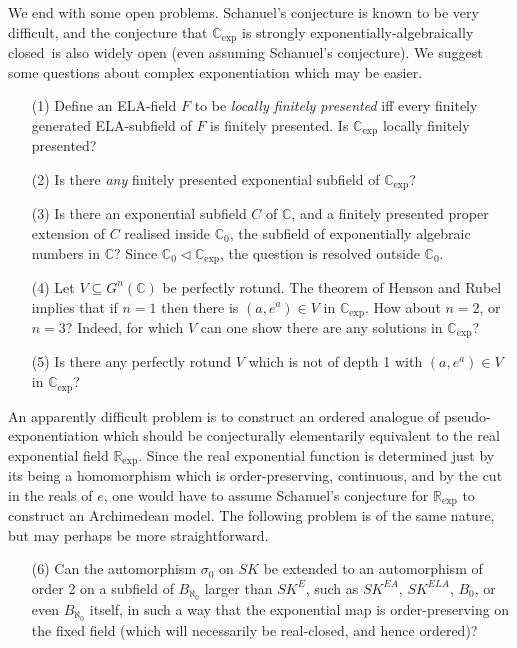 \documentclass[12pt]{amsart}
\theoremstyle{definition}
\begin{document}
We end with some open problems. Schanuel's conjecture is known to be very difficult, and the conjecture that ${\ensuremath{\mathbb{C}_{\mathrm{exp}}}}$ is {strongly exponentially-algebraically closed}\ is also widely open (even assuming Schanuel's conjecture). We suggest some questions about complex exponentiation which may be easier.

\begin{enumerate}
 \item[(1)] Define an ELA-field $F$ to be \emph{locally finitely presented} iff
  every finitely generated ELA-subfield of $F$ is finitely presented. Is ${\ensuremath{\mathbb{C}_{\mathrm{exp}}}}$ locally finitely presented?
 \item[(2)] Is there \emph{any} finitely presented exponential subfield of ${\ensuremath{\mathbb{C}_{\mathrm{exp}}}}$?
 \item[(3)] Is there an exponential subfield $C$ of ${\ensuremath{\mathbb{C}}}$, and a finitely presented proper extension of $C$ realised inside ${\ensuremath{\mathbb{C}}}_0$, the subfield of exponentially algebraic numbers in ${\ensuremath{\mathbb{C}}}$? Since ${\ensuremath{\mathbb{C}}}_0 {\ensuremath{\lhd}} {\ensuremath{\mathbb{C}_{\mathrm{exp}}}}$, the question is resolved outside ${\ensuremath{\mathbb{C}}}_0$.
 \item[(4)] Let $V {\subseteq} G^n({\ensuremath{\mathbb{C}}})$ be perfectly rotund. The theorem of Henson and Rubel \cite[Theorem~5.4]{HR84} implies that if $n=1$ then there is $(a,e^a) \in V$ in {\ensuremath{\mathbb{C}_{\mathrm{exp}}}}. How about $n=2$, or $n=3$? Indeed, for which $V$ can one show there are any solutions in ${\ensuremath{\mathbb{C}_{\mathrm{exp}}}}$? 
 \item[(5)] Is there any perfectly rotund $V$ which is not of depth 1 with $(a,e^a) \in V$ in {\ensuremath{\mathbb{C}_{\mathrm{exp}}}}?
\end{enumerate}

An apparently difficult problem is to construct an ordered analogue of pseudo-exponentiation which should be conjecturally elementarily equivalent to the real exponential field ${\ensuremath{\mathbb{R}_{\mathrm{exp}}}}$. Since the real exponential function is determined just by its being a homomorphism which is order-preserving, continuous, and by the cut in the reals of $e$, one would have to assume Schanuel's conjecture for ${\ensuremath{\mathbb{R}_{\mathrm{exp}}}}$ to construct an Archimedean model. The following problem is of the same nature, but may perhaps be more straightforward.
\begin{enumerate}
  \item[(6)] Can the automorphism $\sigma_0$ on $SK$ be extended to an automorphism of order 2 on a subfield of $B_{\aleph_0}$ larger than $SK^E$, such as $SK^{EA}$,  $SK^{ELA}$, $B_0$, or even $B_{\aleph_0}$ itself, in such a way that the exponential map is order-preserving on the fixed field (which will necessarily be real-closed, and hence ordered)?
\end{enumerate}
\end{document}
